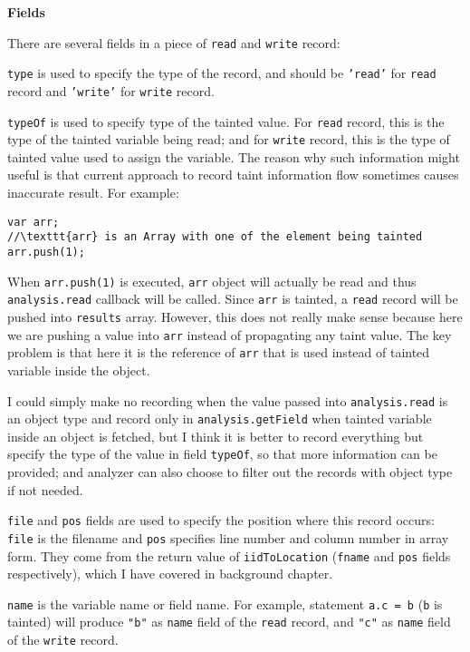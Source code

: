 \textbf{Fields}

There are several fields in a piece of \texttt{read} and \texttt{write} record:

\texttt{type} is used to specify the type of the record, and should be \texttt{'read'} for \texttt{read} record and \texttt{'write'} for \texttt{write} record.

\texttt{typeOf} is used to specify type of the tainted value. For \texttt{read} record, this is the type of the tainted variable being read; and for \texttt{write} record, this is the type of tainted value used to assign the variable. The reason why such information might useful is that current approach to record taint information flow sometimes causes inaccurate result. For example:

\begin{verbatim}
var arr; 
//\texttt{arr} is an Array with one of the element being tainted
arr.push(1);
\end{verbatim}

When \texttt{arr.push(1)} is executed, \texttt{arr} object will actually be read and thus \texttt{analysis.read} callback will be called. Since \texttt{arr} is tainted, a \texttt{read} record will be pushed into \texttt{results} array. However, this does not really make sense because here we are pushing a value into \texttt{arr} instead of propagating any taint value. The key problem is that here it is the reference of \texttt{arr} that is used instead of tainted variable inside the object. 

I could simply make no recording when the value passed into \texttt{analysis.read} is an object type and record only in \texttt{analysis.getField} when tainted variable inside an object is fetched, but I think it is better to record everything but specify the type of the value in field \texttt{typeOf}, so that more information can be provided; and analyzer can also choose to filter out the records with object type if not needed.

\texttt{file} and \texttt{pos} fields are used to specify the position where this record occurs: \texttt{file} is the filename and \texttt{pos} specifies line number and column number in array form. They come from the return value of \texttt{iidToLocation} (\texttt{fname} and \texttt{pos} fields respectively), which I have covered in background chapter.

\texttt{name} is the variable name or field name. For example, statement \texttt{a.c = b} (\texttt{b} is tainted) will produce \texttt{"b"} as \texttt{name} field of the \texttt{read} record, and \texttt{"c"} as \texttt{name} field of the \texttt{write} record.

